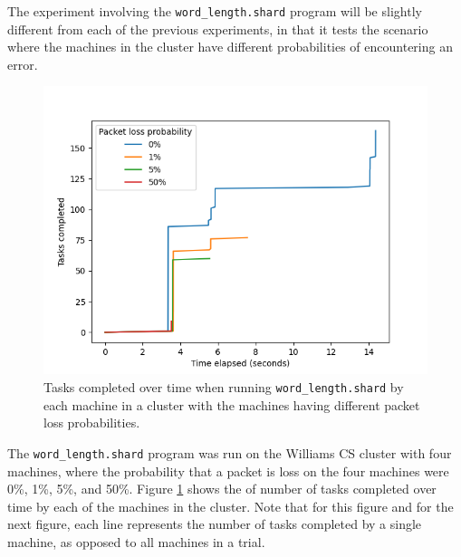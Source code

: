 \documentclass[oneside]{report}
\begin{document}
The experiment involving the \texttt{word\_length.shard} program will be slightly different from each of the previous experiments, in that it tests the scenario where the machines in the cluster have different probabilities of encountering an error.


\begin{figure}[h]
  \begin{center}
    \includegraphics[scale=0.9]{img/experiments/e10_1622303333499.png}
    \caption{Tasks completed over time when running \texttt{word\_length.shard} by each machine in a cluster with the machines having different packet loss probabilities.}
    \label{fig:packetlosswordlength}
  \end{center}
\end{figure}

The \texttt{word\_length.shard} program was run on the Williams CS cluster with four machines, where the probability that a packet is loss on the four machines were 0\%, 1\%, 5\%, and 50\%.
Figure \ref{fig:packetlosswordlength} shows the of number of tasks completed over time by each of the machines in the cluster.
Note that for this figure and for the next figure, each line represents the number of tasks completed by a single machine, as opposed to all machines in a trial.
\end{document}
